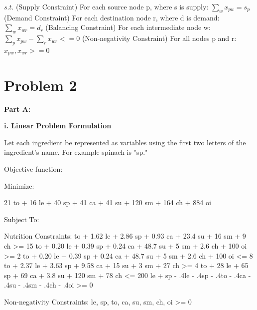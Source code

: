 \documentclass[paper=a4, fontsize=11pt]{scrartcl} %
\numberwithin{equation}{section} %
\numberwithin{figure}{section} %
\numberwithin{table}{section} %
\begin{document}
$s.t.$\newline
(Supply Constraint) For each source node p, where s is supply: $\sum_{w}{x_{pw}} = s_{p}$\newline
(Demand Constraint) For each destination node r, where d is demand: $\sum_{w}{x_{wr}} = d_{r}$\newline
(Balancing Constraint) For each intermediate node w: $\sum_{p}{x_{pw}} - \sum_{r}{x_{wr}} <= 0$\newline
(Non-negativity Constraint) For all nodes p and r: $x_{pw}, x_{wr} >= 0$\newline


\section{Problem 2}
\textbf{Part A:}
	
	\textbf{i. Linear Problem Formulation}\newline
    
    Let each ingredient be represented as variables using the first two letters of the ingredient's name. For example spinach is "sp."\newline
    

    Objective function:\newline
    
    Minimize:\newline
    
    21 to + 16 le + 40 sp + 41 ca + 41 su + 120 sm + 164 ch + 884 oi\newline
	  
	Subject To:\newline
		
		Nutrition Constraints: to + 1.62 le + 2.86 sp + 0.93 ca + 23.4 su + 16 sm + 9 ch >= 15 to + 0.20 le + 0.39 sp + 0.24 ca + 48.7 su + 5 sm + 2.6 ch + 100 oi >= 2 to + 0.20 le + 0.39 sp + 0.24 ca + 48.7 su + 5 sm + 2.6 ch + 100 oi <= 8 to + 2.37 le + 3.63 sp + 9.58 ca + 15 su + 3 sm + 27 ch >= 4 to + 28 le + 65 sp + 69 ca + 3.8 su + 120 sm + 78 ch <= 200\newline
		   le + sp - .4le - .4sp - .4to - .4ca - .4su - .4sm - .4ch - .4oi >= 0\newline
		
		Non-negativity Constraints:\newline
		   le, sp, to, ca, su, sm, ch, oi >= 0\newline
    
\end{document}
